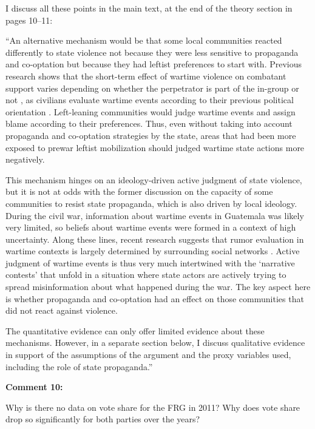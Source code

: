 \documentclass[12pt, a4paper, notitlepage]{article}
\begin{document}
I discuss all these points in the main text, at the end of the theory section in pages 10--11:

``An alternative mechanism would be that some local communities reacted differently to state violence not because they were less sensitive to propaganda and co-optation but because they had leftist preferences to start with.
Previous research shows that the short-term effect of wartime violence on combatant support varies depending on whether the perpetrator is part of the in-group or not \citep{Lyall:2013aa}, as civilians evaluate wartime events according to their previous political orientation \citep{Silverman:2019aa, Pechenkina:2020ul}.
Left-leaning communities would judge wartime events and assign blame according to their preferences.
Thus, even without taking into account propaganda and co-optation strategies by the state, areas that had been more exposed to prewar leftist mobilization should judged wartime state actions more negatively.

This mechanism hinges on an ideology-driven active judgment of state violence, but it is not at odds with the former discussion on the capacity of some communities to resist state propaganda, which is also driven by local ideology.
During the civil war, information about wartime events in Guatemala was likely very limited, so beliefs about wartime events were formed in a context of high uncertainty.
Along these lines, recent research suggests that rumor evaluation in wartime contexts is largely determined by surrounding social networks \citep{Schon:2021wf}.
Active judgment of wartime events is thus very much intertwined with the `narrative contests' that unfold in a situation where state actors are actively trying to spread misinformation about what happened during the war.
The key aspect here is whether propaganda and co-optation had an effect on those communities that did not react against violence.

The quantitative evidence can only offer limited evidence about these mechanisms.
However, in a separate section below, I discuss qualitative evidence in support of the assumptions of the argument and the proxy variables used, including the role of state propaganda.''


\vspace{15pt}
\noindent\textbf{Comment 10:}
\begin{displayquote}
Why is there no data on vote share for the FRG in 2011? Why does vote share drop so significantly for both parties over the years?
\end{displayquote}
\end{document}
